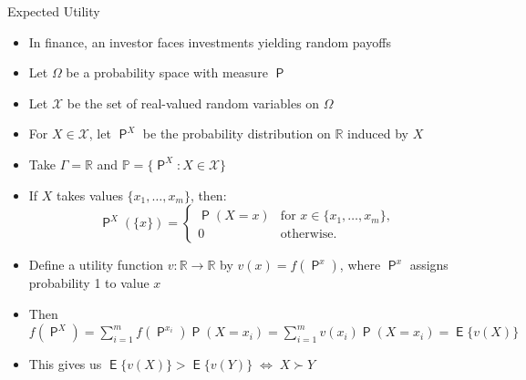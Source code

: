 \documentclass[10pt]{beamer}
\newcommand{\ifff}{\;\Longleftrightarrow\;}
\DeclareMathOperator\prb{\mathsf{P}}
\DeclareMathOperator\expc{\mathsf{E}}
\theoremstyle{definition}
\begin{document}
\begin{frame}{Expected Utility}
  \begin{itemize}[<+->]
    \item In finance, an investor faces investments yielding random payoffs
    \item Let $\Omega$ be a probability space with measure $\prb$
    \item Let $\mathcal{X}$ be the set of real-valued random variables on $\Omega$
    \item For $X \in \mathcal{X}$, let $\prb^X$ be the probability distribution on $\mathbb{R}$ induced by $X$
    \item Take $\Gamma = \mathbb{R}$ and $\mathbb{P} = \{\prb^X : X \in \mathcal{X}\}$
    \item If $X$ takes values $\{x_1, \ldots, x_m\}$, then:
      \[\prb^X(\{x\}) = 
      \begin{cases}
      \prb(X = x) & \text{for } x \in \{x_1, \ldots, x_m\}, \\
      0 & \text{otherwise}.
      \end{cases}\]
    \item Define a utility function $v: \mathbb{R} \to \mathbb{R}$ by $v(x) = f(\prb^x)$, where $\prb^x$ assigns probability 1 to value $x$
    \item Then $f(\prb^X) = \sum_{i=1}^m f(\prb^{x_i})\prb(X = x_i) = \sum_{i=1}^m v(x_i)\prb(X = x_i) = \expc\{v(X)\}$
    \item This gives us $\expc\{v(X)\} > \expc\{v(Y)\} \ifff X \succ Y$
  \end{itemize}
\end{frame}
\end{document}
